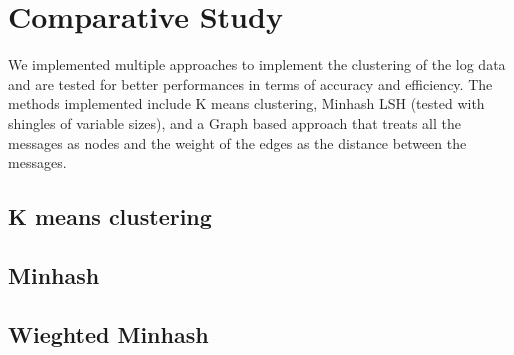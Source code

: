 
\section{Comparative Study}\label{sec:contents}
We implemented multiple approaches to implement the clustering of the log data and are tested for better performances in terms of accuracy and efficiency. The methods implemented include K means clustering, Minhash LSH (tested with shingles of variable sizes), and a Graph based approach that treats all the messages as nodes and the weight of the edges as the distance between the messages. 

\subsection{K means clustering}\label{sec:_before_you_start}


\subsection{Minhash}\label{sec:_the_abstract}



\subsection{Wieghted Minhash}\label{sec:_the_abstract}

